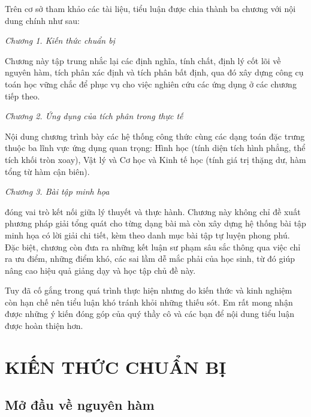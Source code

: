 \documentclass[12pt,a4paper,oneside]{book}
\theoremstyle{theorem}
\theoremstyle{definition}
\begin{document}
            Trên cơ sở tham khảo các tài liệu, tiểu luận được chia thành ba chương với nội dung chính như sau:
            
            \textit{Chương 1. Kiến thức chuẩn bị}
           
           Chương này tập trung nhắc lại các định nghĩa, tính chất, định lý cốt lõi về nguyên hàm, tích phân xác định và tích phân bất định, qua đó xây dựng công cụ toán học vững chắc để phục vụ cho việc nghiên cứu các ứng dụng ở các chương tiếp theo.

            \textit{Chương 2. Ứng dụng của tích phân trong thực tế}
         
          Nội dung chương trình bày các hệ thống công thức cùng các dạng toán đặc trưng thuộc ba lĩnh vực ứng dụng quan trọng: Hình học (tính diện tích hình phẳng, thể tích khối tròn xoay), Vật lý và Cơ học và Kinh tế học (tính giá trị thặng dư, hàm tổng từ hàm cận biên).
             
             \textit{Chương 3. Bài tập minh họa}
             
        đóng vai trò kết nối giữa lý thuyết và thực hành. Chương này không chỉ đề xuất phương pháp giải tổng quát cho từng dạng bài mà còn xây dựng hệ thống bài tập minh họa có lời giải chi tiết, kèm theo danh mục bài tập tự luyện phong phú. Đặc biệt, chương còn đưa ra những kết luận sư phạm sâu sắc thông qua việc chỉ ra ưu điểm, những điểm khó, các sai lầm dễ mắc phải của học sinh, từ đó giúp nâng cao hiệu quả giảng dạy và học tập chủ đề này.
        
        Tuy đã cố gắng trong quá trình thực hiện nhưng do kiến thức và kinh nghiệm còn hạn chế nên tiểu luận khó tránh khỏi những thiếu sót. Em rất mong nhận được những ý kiến đóng góp của quý thầy cô và các bạn để nội dung tiểu luận được hoàn thiện hơn.

	
	
	
\chapter{KIẾN THỨC CHUẨN BỊ}
   \section{Mở đầu về nguyên hàm}
\end{document}
